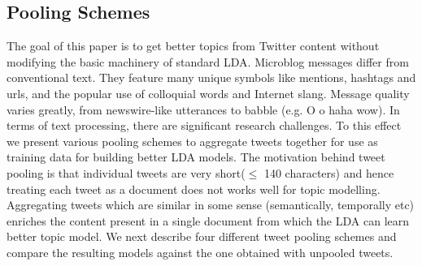 \documentclass[10pt,a5paper,twoside]{article}
\begin{document}
\subsection{Pooling Schemes}



The goal of this paper is to get better topics from Twitter content without modifying the basic machinery of standard LDA. Microblog messages differ from conventional text. They feature many unique symbols like mentions, hashtags and urls, and the popular use of colloquial words and Internet slang. Message quality varies greatly, from newswire-like utterances  to babble (e.g. O o haha wow). In terms of text processing, there are significant research challenges. To this effect we present various pooling schemes to aggregate tweets together for use as training data for building better LDA models. The motivation behind tweet pooling is that individual tweets are very short($\leq$ 140 characters) and hence treating each tweet as a document does not works well for topic modelling. Aggregating tweets which are similar in some sense (semantically, temporally etc) enriches the content present in a single document from which the LDA can learn better topic model. We next describe four different tweet pooling schemes and compare the resulting models against the one obtained with unpooled tweets.
\end{document}

